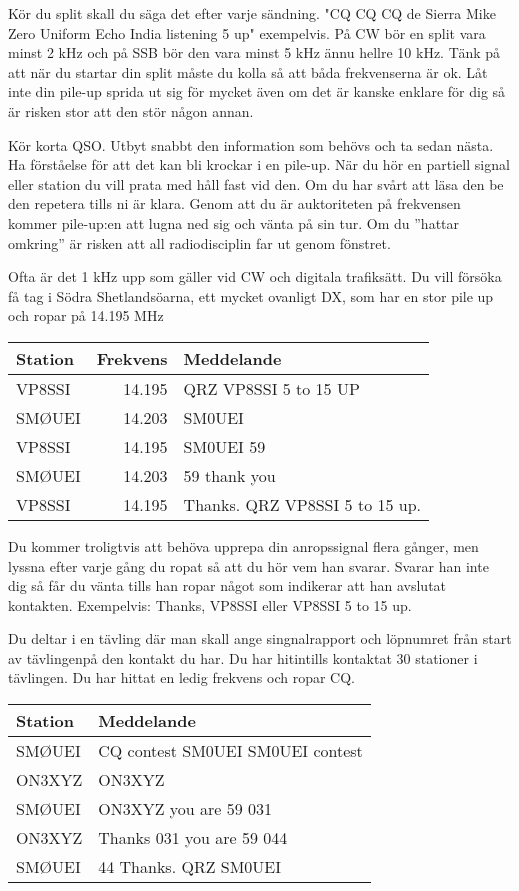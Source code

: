 Kör du split skall du säga det efter varje sändning. "CQ CQ CQ de Sierra Mike Zero Uniform Echo India listening 5 up" exempelvis. På CW bör en split vara minst 2 kHz och på SSB bör den vara minst 5 kHz ännu hellre 10 kHz. Tänk på att när du startar din split måste du kolla så att båda frekvenserna är ok. Låt inte din pile-up sprida ut sig för mycket även om det är kanske enklare för dig så är risken stor att den stör någon annan.

Kör korta QSO. Utbyt snabbt den information som behövs och ta sedan nästa. Ha förståelse för att det kan bli krockar i en pile-up. När du hör en partiell signal eller station du vill prata med håll fast vid den. Om du har svårt att läsa den be den repetera tills ni är klara. Genom att du är auktoriteten på frekvensen kommer pile-up:en att lugna ned sig och vänta på sin tur. Om du ''hattar omkring'' är risken att all radiodisciplin far ut genom fönstret.

Ofta är det 1 kHz upp som gäller vid CW och digitala trafiksätt.
Du vill försöka få tag i Södra Shetlandsöarna, ett mycket ovanligt DX, som har en stor pile up och ropar på 14.195 MHz

\begin{tabular}{lrl}
	Station & Frekvens & Meddelande                     \\ \hline
	VP8SSI  &   14.195 & QRZ VP8SSI  5 to 15 UP         \\
	SMØUEI  &   14.203 & SM0UEI                         \\
	VP8SSI  &   14.195 & SM0UEI 59                      \\
	SMØUEI  &   14.203 & 59 thank you                   \\
	VP8SSI  &   14.195 & Thanks. QRZ VP8SSI 5 to 15 up.
\end{tabular}

Du kommer troligtvis att behöva upprepa din anropssignal flera gånger, men lyssna efter varje gång du ropat så att du hör vem han svarar. Svarar han inte dig så får du vänta tills han ropar något som indikerar att han avslutat kontakten. Exempelvis: Thanks, VP8SSI eller VP8SSI 5 to 15 up.

Du deltar i en tävling där man skall ange singnalrapport och löpnumret från start av tävlingenpå den kontakt du har. Du har hitintills kontaktat 30 stationer i tävlingen. Du har hittat en ledig frekvens och ropar CQ.

\begin{tabular}{ll}
	Station & Meddelande                       \\ \hline
	SMØUEI  & CQ contest SM0UEI SM0UEI contest \\
	ON3XYZ  & ON3XYZ                           \\
	SMØUEI  & ON3XYZ you are 59 031            \\
	ON3XYZ  & Thanks 031 you are 59 044        \\
	SMØUEI  & 44 Thanks. QRZ SM0UEI
\end{tabular}

